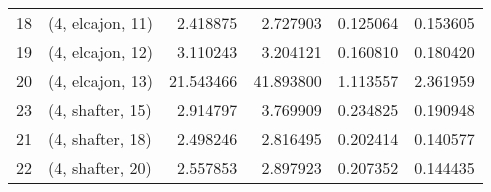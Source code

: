 \begin{tabular}{llrrrr}
18 &  (4, elcajon, 11) &   2.418875 &   2.727903 &   0.125064 &  0.153605 \\
19 &  (4, elcajon, 12) &   3.110243 &   3.204121 &   0.160810 &  0.180420 \\
20 &  (4, elcajon, 13) &  21.543466 &  41.893800 &   1.113557 &  2.361959 \\
23 &  (4, shafter, 15) &   2.914797 &   3.769909 &   0.234825 &  0.190948 \\
21 &  (4, shafter, 18) &   2.498246 &   2.816495 &   0.202414 &  0.140577 \\
22 &  (4, shafter, 20) &   2.557853 &   2.897923 &   0.207352 &  0.144435 \\
\bottomrule
\end{tabular}
